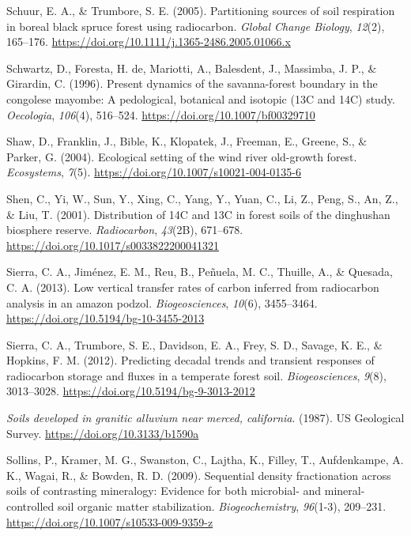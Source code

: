 \documentclass[]{article}
\begin{document}
\leavevmode\hypertarget{ref-Schuur_2005}{}%
Schuur, E. A., \& Trumbore, S. E. (2005). Partitioning sources of soil
respiration in boreal black spruce forest using radiocarbon.
\emph{Global Change Biology}, \emph{12}(2), 165--176.
\url{https://doi.org/10.1111/j.1365-2486.2005.01066.x}

\leavevmode\hypertarget{ref-Schwartz_1996}{}%
Schwartz, D., Foresta, H. de, Mariotti, A., Balesdent, J., Massimba, J.
P., \& Girardin, C. (1996). Present dynamics of the savanna-forest
boundary in the congolese mayombe: A pedological, botanical and isotopic
(13C and 14C) study. \emph{Oecologia}, \emph{106}(4), 516--524.
\url{https://doi.org/10.1007/bf00329710}

\leavevmode\hypertarget{ref-Shaw_2004}{}%
Shaw, D., Franklin, J., Bible, K., Klopatek, J., Freeman, E., Greene,
S., \& Parker, G. (2004). Ecological setting of the wind river
old-growth forest. \emph{Ecosystems}, \emph{7}(5).
\url{https://doi.org/10.1007/s10021-004-0135-6}

\leavevmode\hypertarget{ref-Shen_2001}{}%
Shen, C., Yi, W., Sun, Y., Xing, C., Yang, Y., Yuan, C., Li, Z., Peng,
S., An, Z., \& Liu, T. (2001). Distribution of 14C and 13C in forest
soils of the dinghushan biosphere reserve. \emph{Radiocarbon},
\emph{43}(2B), 671--678. \url{https://doi.org/10.1017/s0033822200041321}

\leavevmode\hypertarget{ref-Sierra_2013}{}%
Sierra, C. A., Jiménez, E. M., Reu, B., Peñuela, M. C., Thuille, A., \&
Quesada, C. A. (2013). Low vertical transfer rates of carbon inferred
from radiocarbon analysis in an amazon podzol. \emph{Biogeosciences},
\emph{10}(6), 3455--3464. \url{https://doi.org/10.5194/bg-10-3455-2013}

\leavevmode\hypertarget{ref-Sierra_2012}{}%
Sierra, C. A., Trumbore, S. E., Davidson, E. A., Frey, S. D., Savage, K.
E., \& Hopkins, F. M. (2012). Predicting decadal trends and transient
responses of radiocarbon storage and fluxes in a temperate forest soil.
\emph{Biogeosciences}, \emph{9}(8), 3013--3028.
\url{https://doi.org/10.5194/bg-9-3013-2012}

\leavevmode\hypertarget{ref-1987}{}%
\emph{Soils developed in granitic alluvium near merced, california}.
(1987). US Geological Survey. \url{https://doi.org/10.3133/b1590a}

\leavevmode\hypertarget{ref-Sollins_2009}{}%
Sollins, P., Kramer, M. G., Swanston, C., Lajtha, K., Filley, T.,
Aufdenkampe, A. K., Wagai, R., \& Bowden, R. D. (2009). Sequential
density fractionation across soils of contrasting mineralogy: Evidence
for both microbial- and mineral-controlled soil organic matter
stabilization. \emph{Biogeochemistry}, \emph{96}(1-3), 209--231.
\url{https://doi.org/10.1007/s10533-009-9359-z}
\end{document}
